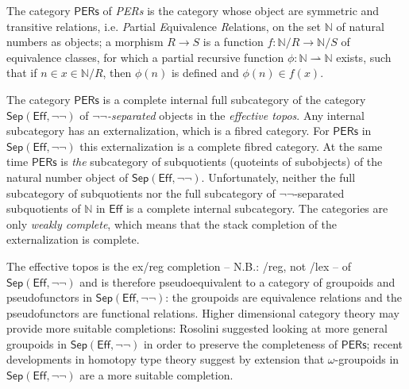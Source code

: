\documentclass[12pt, a4paper]{article}
\theoremstyle{plain}
\theoremstyle{definition}
\begin{document}


\newcommand\N{\mathbb N}
\newcommand\partar\rightharpoonup
\newcommand\pers{\mathsf{PERs}}
\newcommand\sep{\mathsf{Sep}}
\newcommand\eff{\mathsf{Eff}}
The category $\pers$ of \emph{PERs} is the category whose object are symmetric and transitive relations, i.e. \emph Partial \emph Equivalence \emph Relations, on the set $\N$ of natural numbers as objects; a morphism $R\to S$ is a function $f:\N/R \to \N/S$ of equivalence classes, for which a partial recursive function $\phi: \N\partar\N$ exists, such that if $n\in x \in \N/R$, then $\phi(n)$ is defined and $\phi(n)\in f(x)$.

The category $\pers$ is a complete internal full subcategory of the category $\sep(\eff,\neg\neg)$ of \emph{$\neg\neg$-separated} objects in the \emph{effective topos}. Any internal subcategory has an externalization, which is a fibred category. For $\pers$ in $\sep(\eff,\neg\neg)$ this externalization is a complete fibred category. At the same time $\pers$ is \emph{the} subcategory of subquotients (quoteints of subobjects) of the natural number object of $\sep(\eff,\neg\neg)$. 
Unfortunately, neither the full subcategory of subquotients nor the full subcategory of $\neg\neg$-separated subquotients of $\N$ in $\eff$ is a complete internal subcategory. The categories are only \emph{weakly complete}, which means that the stack completion of the externalization is complete. 

The effective topos is the ex/reg completion -- N.B.: /reg, not /lex -- of $\sep(\eff,\neg\neg)$ and is therefore pseudoequivalent to a category of groupoids and pseudofunctors in $\sep(\eff,\neg\neg)$: the groupoids are equivalence relations and the pseudofunctors are functional relations. Higher dimensional category theory may provide more suitable completions: Rosolini suggested looking at more general groupoids in $\sep(\eff,\neg\neg)$ in order to preserve the completeness of $\pers$; recent developments in homotopy type theory suggest by extension that $\omega$-groupoids in $\sep(\eff,\neg\neg)$ are a more suitable completion.

\end{document}
